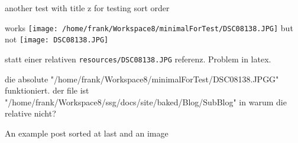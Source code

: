 \documentclass[a4paper,10pt]{scrbook}
\begin{document}
another test with title z for testing sort order


 
works \texttt{[image: /home/frank/Workspace8/minimalForTest/DSC08138.JPG]}
but not  \texttt{[image: DSC08138.JPG]}
 
statt einer relativen \texttt{resources/DSC08138.JPG} referenz. Problem
in latex.

die absolute
"/home/frank/Workspace8/minimalForTest/DSC08138.JPGG"
funktioniert. der file ist
"/home/frank/Workspace8/ssg/docs/site/baked/Blog/SubBlog" in warum die
relative nicht?

An example post sorted at last and an image

\printindex
\end{document}
